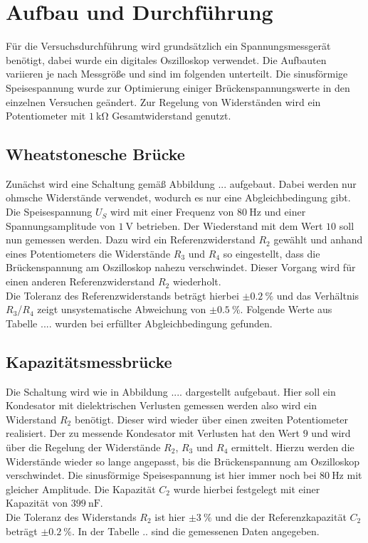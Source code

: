 \section{Aufbau und Durchführung}

Für die Versuchsdurchführung wird grundsätzlich ein Spannungsmessgerät benötigt, dabei wurde ein digitales Oszilloskop verwendet. Die Aufbauten variieren je nach Messgröße und sind
im folgenden unterteilt. Die sinusförmige Speisespannung wurde zur Optimierung einiger Brückenspannungswerte in den einzelnen Versuchen geändert. Zur Regelung von Widerständen wird ein Potentiometer mit $\SI{1}{\kilo\ohm}$ Gesamtwiderstand 
genutzt.

\subsection{Wheatstonesche Brücke}
\label{sec:weedyo}
Zunächst wird eine Schaltung gemäß Abbildung ... aufgebaut. Dabei werden nur ohmsche Widerstände verwendet, wodurch es nur eine Abgleichbedingung gibt. Die Speisespannung $U_{S}$ wird mit einer Frequenz von
$\SI{80}{\hertz}$ und einer Spannungsamplitude von $\SI{1}{\volt}$ betrieben. Der Wiederstand mit dem Wert $10$ soll nun gemessen werden. Dazu wird ein Referenzwiderstand $R_{2}$ gewählt und anhand eines Potentiometers die Widerstände 
$R_{3}$ und $R_{4}$ so eingestellt, dass die Brückenspannung am Oszilloskop nahezu verschwindet. Dieser Vorgang wird für einen anderen Referenzwiderstand $R_{2}$ wiederholt. 
\\
\newline
Die Toleranz des Referenzwiderstands beträgt hierbei $\pm\SI{0.2}{\percent}$ und das Verhältnis $R_{3}$/$R_{4}$ zeigt unsystematische Abweichung von $\pm\SI{0.5}{\percent}$.
Folgende Werte aus Tabelle .... wurden bei erfüllter Abgleichbedingung gefunden.

\subsection{Kapazitätsmessbrücke}
Die Schaltung wird wie in Abbildung .... dargestellt aufgebaut. Hier soll ein Kondesator mit dielektrischen Verlusten gemessen werden also wird ein Widerstand $R_{2}$ benötigt. Dieser wird wieder über einen
zweiten Potentiometer realisiert. Der zu messende Kondesator mit 
Verlusten hat den Wert $9$ und wird über die Regelung der Widerstände $R_{2}$, $R_{3}$ und $R_{4}$ ermittelt. Hierzu werden die Widerstände wieder so lange angepasst, bis die Brückenspannung am Oszilloskop verschwindet.
Die sinusförmige Speisespannung ist hier immer noch bei $\SI{80}{\hertz}$ mit gleicher Amplitude. Die Kapazität $C_{2}$ wurde hierbei festgelegt mit einer Kapazität von $\SI{399}{\nano\farad}$.
\\
\newline
Die Toleranz des Widerstands $R_{2}$ ist hier $\pm\SI{3}{\percent}$ und die der Referenzkapazität $C_{2}$ beträgt $\pm\SI{0.2}{\percent}$.
In der Tabelle .. sind die gemessenen Daten angegeben.

